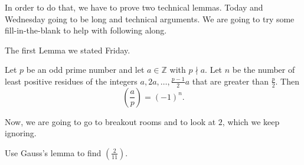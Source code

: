 \documentclass[letterpaper, 11 pt]{article}
\begin{document}
In order to do that, we have to prove two technical lemmas. Today and Wednesday going to be long and technical arguments. We are going to try some fill-in-the-blank to help with following along. 

The first Lemma we stated Friday.

\begin{lem}
Let $p$ be an odd prime number and let $a\in\mathbb{Z}$ with $p\nmid a$. Let $n$ be the number of least positive residues of the integers $a,2a,\dots, \frac{p-1}{2} a$ that are greater than $\frac{p}{2}$. Then 
\[\left(\frac{a}{p}\right)=(-1)^n.\]
\end{lem}

Now, we are going to go to breakout rooms and to look at $2$, which we keep ignoring.
\begin{br}
  Use Gauss's lemma to find $\left(\frac{2}{11}\right)$. 
\end{br} 
\end{document}
